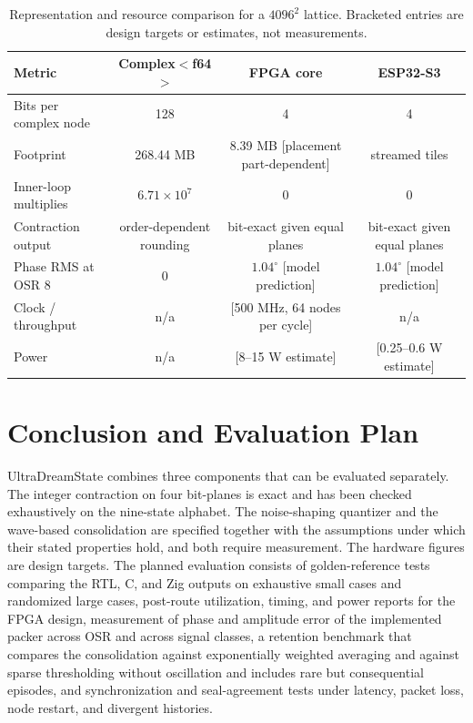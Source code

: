 \documentclass[10pt, twocolumn, a4paper]{article}
\begin{document}
\begin{table}[t]
\centering
\caption{Representation and resource comparison for a $4096^2$ lattice. Bracketed entries are design targets or estimates, not measurements.}
\vspace{4pt}
\scriptsize
\begin{tabular}{@{}lccc@{}}
\toprule
\textbf{Metric} & \textbf{Complex$<$f64$>$} & \textbf{FPGA core} & \textbf{ESP32-S3} \\
\midrule
Bits per complex node & 128 & 4 & 4 \\
Footprint & 268.44 MB & 8.39 MB [placement part-dependent] & streamed tiles \\
Inner-loop multiplies & $6.71\times10^7$ & 0 & 0 \\
Contraction output & order-dependent rounding & bit-exact given equal planes & bit-exact given equal planes \\
Phase RMS at OSR 8 & 0 & $1.04^\circ$ [model prediction] & $1.04^\circ$ [model prediction] \\
Clock / throughput & n/a & [500 MHz, 64 nodes per cycle] & n/a \\
Power & n/a & [8--15 W estimate] & [0.25--0.6 W estimate] \\
\bottomrule
\end{tabular}
\label{tab:stack}
\end{table}

\section{Conclusion and Evaluation Plan}\label{sec:conclusion}

UltraDreamState combines three components that can be evaluated separately. The integer contraction on four bit-planes is exact and has been checked exhaustively on the nine-state alphabet. The noise-shaping quantizer and the wave-based consolidation are specified together with the assumptions under which their stated properties hold, and both require measurement. The hardware figures are design targets. The planned evaluation consists of golden-reference tests comparing the RTL, C, and Zig outputs on exhaustive small cases and randomized large cases, post-route utilization, timing, and power reports for the FPGA design, measurement of phase and amplitude error of the implemented packer across OSR and across signal classes, a retention benchmark that compares the consolidation against exponentially weighted averaging and against sparse thresholding without oscillation and includes rare but consequential episodes, and synchronization and seal-agreement tests under latency, packet loss, node restart, and divergent histories.
\end{document}
